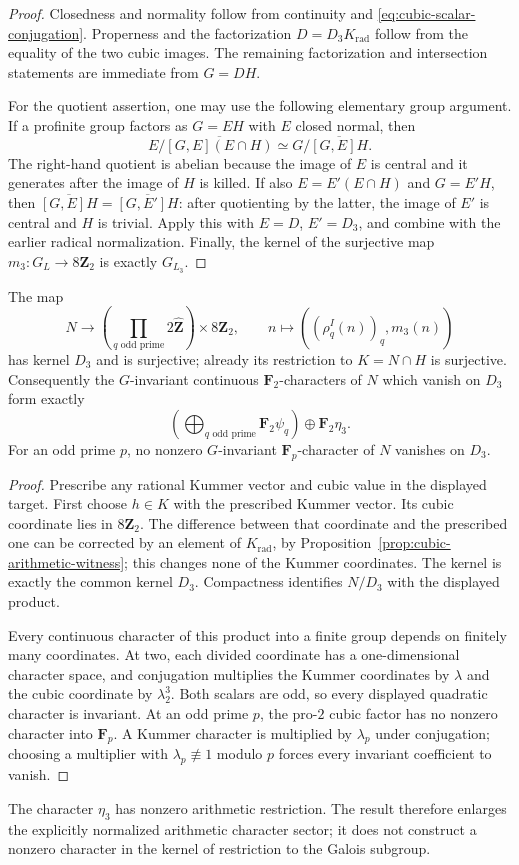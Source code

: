 \begin{proof}
Closedness and normality follow from continuity and
\eqref{eq:cubic-scalar-conjugation}.  Properness and the factorization
$D=D_3K_{\mathrm{rad}}$ follow from the equality of the two cubic
images.  The remaining factorization and intersection statements are
immediate from $G=DH$.

For the quotient assertion, one may use the following elementary
group argument.  If a profinite group factors as $G=EH$ with $E$
closed normal, then
\[
 E/\overline{[G,E](E\cap H)}
 \simeq G/\overline{[G,E]H}.
\]
The right-hand quotient is abelian because the image of $E$ is
central and it generates after the image of $H$ is killed.  If also
$E=E'(E\cap H)$ and $G=E'H$, then
$\overline{[G,E]H}=\overline{[G,E']H}$: after quotienting by the latter,
the image of $E'$ is central and $H$ is trivial.  Apply this with
$E=D$, $E'=D_3$, and combine with the earlier radical normalization.
Finally, the kernel of the surjective map
$m_3:G_L\to8\mathbf Z_2$ is exactly $G_{L_3}$.
\end{proof}

\begin{corollary}\label{cor:cubic-radical-joint-image}
The map
\[
 N\longrightarrow
 \left(\prod_{q\text{ odd prime}}2\widehat{\mathbf Z}\right)
       \times8\mathbf Z_2,
 \qquad n\longmapsto((\rho_q^I(n))_q,m_3(n))
\]
has kernel $D_3$ and is surjective; already its restriction to
$K=N\cap H$ is surjective.
Consequently the $G$-invariant continuous $\mathbf F_2$-characters
of $N$ which vanish on $D_3$ form exactly
\[
 \left(\bigoplus_{q\text{ odd prime}}\mathbf F_2\psi_q\right)
                \oplus\mathbf F_2\eta_3.
\]
For an odd prime $p$, no nonzero $G$-invariant
$\mathbf F_p$-character of $N$ vanishes on $D_3$.
\end{corollary}

\begin{proof}
Prescribe any rational Kummer vector and cubic value in the displayed
target.  First choose $h\in K$ with the prescribed Kummer vector.
Its cubic coordinate lies in $8\mathbf Z_2$.  The difference between
that coordinate and the prescribed one can be corrected by an element
of $K_{\mathrm{rad}}$, by
Proposition~\ref{prop:cubic-arithmetic-witness}; this changes none of
the Kummer coordinates.  The kernel is exactly the common kernel $D_3$.
Compactness identifies $N/D_3$ with the displayed product.

Every continuous character of this product into a finite group depends
on finitely many coordinates.  At two, each divided coordinate has a
one-dimensional character space, and conjugation multiplies the Kummer
coordinates by $\lambda$ and the cubic coordinate by $\lambda_2^3$.
Both scalars are odd, so every displayed quadratic character is invariant.
At an odd prime $p$, the pro-$2$ cubic factor has no nonzero character
into $\mathbf F_p$.  A Kummer character is multiplied by $\lambda_p$
under conjugation; choosing a multiplier with $\lambda_p\not\equiv1$
modulo $p$ forces every invariant coefficient to vanish.
\end{proof}

The character $\eta_3$ has nonzero arithmetic restriction.  The result
therefore enlarges the explicitly normalized arithmetic character
sector; it does not construct a nonzero character in the kernel of
restriction to the Galois subgroup.
